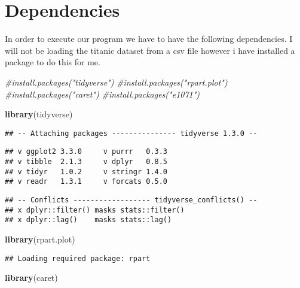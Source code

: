\documentclass[]{article}
\newenvironment{Shaded}{\begin{snugshade}}{\end{snugshade}}
\newcommand{\CommentTok}[1]{\textcolor[rgb]{0.56,0.35,0.01}{\textit{#1}}}
\newcommand{\KeywordTok}[1]{\textcolor[rgb]{0.13,0.29,0.53}{\textbf{#1}}}
\newcommand{\NormalTok}[1]{#1}
\begin{document}
\hypertarget{dependencies}{%
\section{Dependencies}\label{dependencies}}

In order to execute our program we have to have the following
dependencies. I will not be loading the titanic dataset from a csv file
however i have installed a package to do this for me.

\begin{Shaded}
\begin{Highlighting}[]
\CommentTok{#install.packages("tidyverse")}
\CommentTok{#install.packages("rpart.plot") }
\CommentTok{#install.packages("caret")}
\CommentTok{#install.packages("e1071")}
\end{Highlighting}
\end{Shaded}

\begin{Shaded}
\begin{Highlighting}[]
\KeywordTok{library}\NormalTok{(tidyverse)}
\end{Highlighting}
\end{Shaded}

\begin{verbatim}
## -- Attaching packages --------------- tidyverse 1.3.0 --
\end{verbatim}

\begin{verbatim}
## v ggplot2 3.3.0     v purrr   0.3.3
## v tibble  2.1.3     v dplyr   0.8.5
## v tidyr   1.0.2     v stringr 1.4.0
## v readr   1.3.1     v forcats 0.5.0
\end{verbatim}

\begin{verbatim}
## -- Conflicts ------------------ tidyverse_conflicts() --
## x dplyr::filter() masks stats::filter()
## x dplyr::lag()    masks stats::lag()
\end{verbatim}

\begin{Shaded}
\begin{Highlighting}[]
\KeywordTok{library}\NormalTok{(rpart.plot) }
\end{Highlighting}
\end{Shaded}

\begin{verbatim}
## Loading required package: rpart
\end{verbatim}

\begin{Shaded}
\begin{Highlighting}[]
\KeywordTok{library}\NormalTok{(caret)}
\end{Highlighting}
\end{Shaded}
\end{document}

